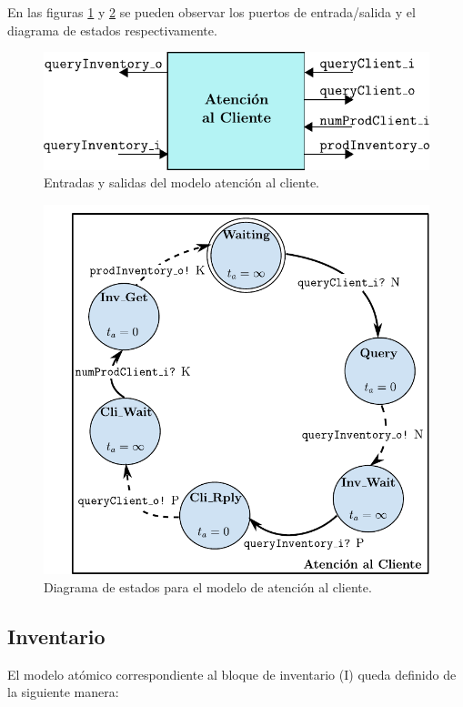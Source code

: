 \documentclass[10pt]{article}
\begin{document}
En las figuras \ref{fig:AC-esquematico} y \ref{fig:AC-estados} se pueden observar los puertos de entrada/salida y el diagrama de estados respectivamente.

\begin{figure}[h]
	\centering
	\includegraphics{img/AC-esquematico}
	\caption{Entradas y salidas del modelo atención al cliente.}
	\label{fig:AC-esquematico}
\end{figure}

\begin{figure}[h]
	\centering
	\includegraphics{img/atencionClientedevsgraph}
	\caption{Diagrama de estados para el modelo de atención al cliente.}
	\label{fig:AC-estados}
\end{figure}
\FloatBarrier

\subsection{Inventario\label{sec:I}}
El modelo atómico correspondiente al bloque de inventario (I) queda definido de la siguiente manera:
\end{document}
